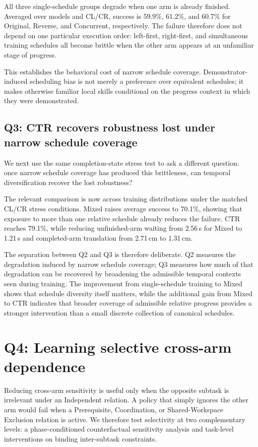 \documentclass{article}
\newcommand{\method}{CTR}
\begin{document}
All three single-schedule groups degrade when one arm is already finished. Averaged over models and CL/CR, success is 59.9\%, 61.2\%, and 60.7\% for Original, Reverse, and Concurrent, respectively. The failure therefore does not depend on one particular execution order: left-first, right-first, and simultaneous training schedules all become brittle when the other arm appears at an unfamiliar stage of progress.

This establishes the behavioral cost of narrow schedule coverage. Demonstrator-induced scheduling bias is not merely a preference over equivalent schedules; it makes otherwise familiar local skills conditional on the progress context in which they were demonstrated.

\subsection{Q3: CTR recovers robustness lost under narrow schedule coverage}
We next use the same completion-state stress test to ask a different question: once narrow schedule coverage has produced this brittleness, can temporal diversification recover the lost robustness?

The relevant comparison is now across training distributions under the matched CL/CR stress conditions. Mixed raises average success to 70.1\%, showing that exposure to more than one relative schedule already reduces the failure. \method{} reaches 79.1\%, while reducing unfinished-arm waiting from 2.56\,s for Mixed to 1.21\,s and completed-arm translation from 2.71\,cm to 1.31\,cm.

The separation between Q2 and Q3 is therefore deliberate. Q2 measures the degradation induced by narrow schedule coverage; Q3 measures how much of that degradation can be recovered by broadening the admissible temporal contexts seen during training. The improvement from single-schedule training to Mixed shows that schedule diversity itself matters, while the additional gain from Mixed to \method{} indicates that broader coverage of admissible relative progress provides a stronger intervention than a small discrete collection of canonical schedules.

\section{Q4: Learning selective cross-arm dependence}
Reducing cross-arm sensitivity is useful only when the opposite subtask is irrelevant under an Independent relation. A policy that simply ignores the other arm would fail when a Prerequisite, Coordination, or Shared-Workspace Exclusion relation is active. We therefore test selectivity at two complementary levels: a phase-conditioned counterfactual sensitivity analysis and task-level interventions on binding inter-subtask constraints.
\end{document}

